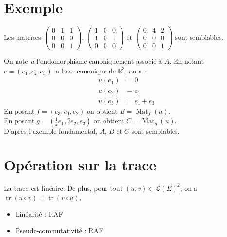 \documentclass[../main.tex]{subfiles}
\begin{document}
\section{Exemple}
\begin{tcolorbox}[title=Exemple 28.60, title filled=false, colframe=darkgreen, colback=darkgreen!10!white]
    Les matrices $\begin{pmatrix}
        0 & 1 & 1 \\
        0 & 0 & 0 \\
        0 & 0 & 1
    \end{pmatrix}$, $\begin{pmatrix}
        1 & 0 & 0 \\
        1 & 0 & 1 \\
        0 & 0 & 0
    \end{pmatrix}$ et $\begin{pmatrix}
        0 & 4 & 2 \\
        0 & 0 & 0 \\
        0 & 0 & 1
    \end{pmatrix}$ sont semblables. 
\end{tcolorbox}

\noindent On note $u$ l'endomorphisme canoniquement associé à $A$. En notant $e = (e_1, e_2, e_3)$ la base canonique de $\mathbb{R}^3$, on a : 
\begin{align*}
    u(e_1) &= 0 \\
    u(e_2) &= e_1 \\
    u(e_3) &= e_1 + e_3
\end{align*}
En posant $f = (e_3, e_1, e_2)$ on obtient $B = \operatorname{Mat}_f(u)$. \\
En posant $g = (\frac{1}{2}e_1, 2e_2, e_3)$ on obtient $C = \operatorname{Mat}_g(u)$. \\
D'après l'exemple fondamental, $A$, $B$ et $C$ sont semblables. 

\section{Opération sur la trace}
\begin{tcolorbox}[title=Propostion 28.63, title filled=false, colframe=lightblue, colback=lightblue!10!white]
    La trace est linéaire. De plus, pour tout $(u, v)\in \mathcal{L}(E)^2$, on a $\operatorname{tr}(u\circ v) = \operatorname{tr}(v\circ u)$. 
\end{tcolorbox}

\begin{itemize}
    \item Linéarité : RAF
    \item Pseudo-commutativité : RAF
\end{itemize}
\end{document}
